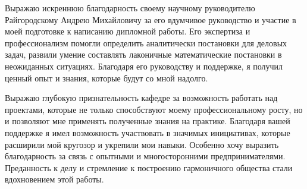 Выражаю искреннюю благодарность своему научному руководителю Райгородскому Андрею Михайловичу за его вдумчивое руководство и участие в моей подготовке к написанию дипломной работы. Его экспертиза и профессионализм помогли определить аналитически постановки для деловых задач, развили умение составлять лаконичные математические постановки в неожиданных ситуациях. Благодаря его руководству и поддержке, я получил ценный опыт и знания, которые будут со мной надолго.

Выражаю глубокую признательность кафедре за возможность работать над проектами, которые не только способствуют моему профессиональному росту, но и позволяют мне применять полученные знания на практике. Благодаря вашей поддержке я имел возможность участвовать в значимых инициативах, которые расширили мой кругозор и укрепили мои навыки. Особенно хочу выразить благодарность за связь с опытными и многосторонними предпринимателями. Преданность к делу и стремление к построению гармоничного общества стали вдохновением этой работы.

